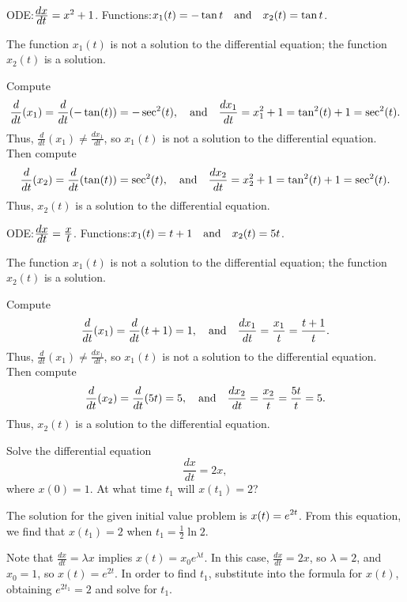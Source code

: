 \documentclass{ximera}
\begin{document}
\begin{exercise}  \label{c3.1.bc}
ODE:\quad $\frac{\displaystyle dx}{\displaystyle dt} = x^2 + 1$.
Functions:\quad $x_1(t)=-\tan t \quad\mbox{and}\quad x_2(t)= \tan t$.

\begin{solution}

\ans The function $x_1(t)$ is not a solution to the differential equation;
the function $x_2(t)$ is a solution.

\soln Compute
\[
\frac{d}{dt}(x_1) = \frac{d}{dt}(-\tan(t)) = -\sec^2(t), \quad\mbox{and}\quad
\frac{dx_1}{dt} = x_1^2 + 1 = \tan^2(t) + 1 = \sec^2(t).
\]
Thus, $\frac{d}{dt}(x_1) \neq \frac{dx_1}{dt}$, so $x_1(t)$ is not a
solution to the differential equation.  Then compute
\[
\frac{d}{dt}(x_2) = \frac{d}{dt}(\tan(t)) = \sec^2(t), \quad\mbox{and}\quad
\frac{dx_2}{dt} = x_2^2 + 1 = \tan^2(t) + 1 = \sec^2(t).
\]
Thus, $x_2(t)$ is a solution to the differential equation. 

\end{solution}
\end{exercise}
\begin{exercise}  \label{c3.1.bd}
ODE:\quad $\frac{\displaystyle dx}{\displaystyle dt} = \frac{\displaystyle x}{\displaystyle t}$.
Functions:\quad $x_1(t)=t+1 \quad\mbox{and}\quad x_2(t)= 5t$.

\begin{solution}

\ans The function $x_1(t)$ is not a solution to the differential equation;
the function $x_2(t)$ is a solution.

\soln Compute
\[
\frac{d}{dt}(x_1) = \frac{d}{dt}(t + 1) = 1, \quad\mbox{and}\quad
\frac{dx_1}{dt} = \frac{x_1}{t} = \frac{t + 1}{t}.
\]
Thus, $\frac{d}{dt}(x_1) \neq \frac{dx_1}{dt}$, so $x_1(t)$ is not a
solution to the differential equation.  Then compute
\[
\frac{d}{dt}(x_2) = \frac{d}{dt}(5t) = 5, \quad\mbox{and}\quad
\frac{dx_2}{dt} = \frac{x_2}{t} = \frac{5t}{t} = 5.
\]
Thus, $x_2(t)$ is a solution to the differential equation.

\end{solution}
\end{exercise}


\begin{exercise} \label{c3.1.1}
Solve the differential equation
\[
\frac{dx}{dt} = 2x,
\]
where $x(0)=1$.  At what time $t_1$ will $x(t_1)=2$?

\begin{solution}

\ans The solution for the given initial value problem is
$\displaystyle x(t) = e^{2t}$.  From this equation, we find that $x(t_1) = 2$
when $t_1 = \frac{1}{2}\ln 2$.

\soln Note that $\frac{dx}{dt} = \lambda x$ implies $x(t) =
x_0e^{\lambda t}$.  In this case, $\frac{dx}{dt} = 2x$, so
$\lambda = 2$, and $x_0 = 1$, so $x(t) = e^{2t}$.  In order to
find $t_1$, substitute into the formula for $x(t)$, obtaining
$e^{2t_1} = 2$ and solve for $t_1$.

\end{solution}
\end{exercise}
\end{document}
